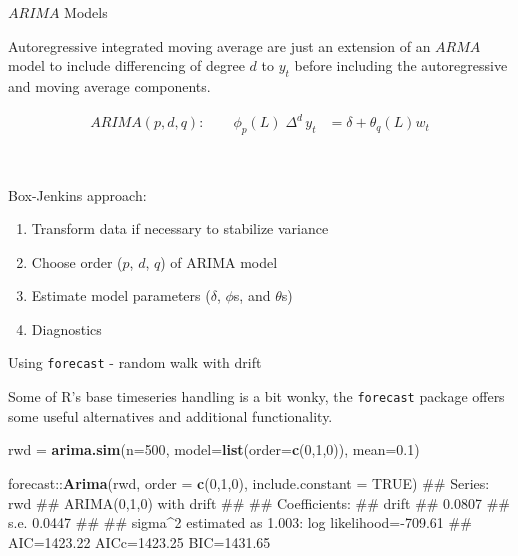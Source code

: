 \documentclass[11pt,ignorenonframetext,]{beamer}
\newenvironment{Shaded}{}{}
\newcommand{\DataTypeTok}[1]{\textcolor[rgb]{0.56,0.13,0.00}{#1}}
\newcommand{\DecValTok}[1]{\textcolor[rgb]{0.25,0.63,0.44}{#1}}
\newcommand{\FloatTok}[1]{\textcolor[rgb]{0.25,0.63,0.44}{#1}}
\newcommand{\KeywordTok}[1]{\textcolor[rgb]{0.00,0.44,0.13}{\textbf{#1}}}
\newcommand{\NormalTok}[1]{#1}
\newcommand{\OperatorTok}[1]{\textcolor[rgb]{0.40,0.40,0.40}{#1}}
\newcommand{\OtherTok}[1]{\textcolor[rgb]{0.00,0.44,0.13}{#1}}
\newcommand{\StringTok}[1]{\textcolor[rgb]{0.25,0.44,0.63}{#1}}
\let\oldShaded\Shaded
\let\endoldShaded\endShaded
\renewenvironment{Shaded}{\footnotesize\begin{spacing}{0.9}\oldShaded}{\endoldShaded\end{spacing}}
\begin{document}
\begin{frame}{%
\protect\hypertarget{arima-models}{%
\(ARIMA\) Models}}

Autoregressive integrated moving average are just an extension of an
\(ARMA\) model to include differencing of degree \(d\) to \(y_t\) before
including the autoregressive and moving average components.

\[
\begin{aligned}
ARIMA(p,d,q): \qquad \phi_p(L) \; \Delta^d \, y_t &= \delta + \theta_q(L) w_t  
\end{aligned}
\]

\pause

\(~\)

Box-Jenkins approach:

\begin{enumerate}
[1.]
\item
  Transform data if necessary to stabilize variance
\item
  Choose order (\(p\), \(d\), \(q\)) of ARIMA model
\item
  Estimate model parameters (\(\delta\), \(\phi\)s, and \(\theta\)s)
\item
  Diagnostics
\end{enumerate}

\end{frame}

\begin{frame}[fragile,t]{%
\protect\hypertarget{using-forecast---random-walk-with-drift}{%
Using \texttt{forecast} - random walk with drift}}

Some of R’s base timeseries handling is a bit wonky, the
\texttt{forecast} package offers some useful alternatives and additional
functionality.

\begin{Shaded}
\begin{Highlighting}[]
\NormalTok{rwd =}\StringTok{ }\KeywordTok{arima.sim}\NormalTok{(}\DataTypeTok{n=}\DecValTok{500}\NormalTok{, }\DataTypeTok{model=}\KeywordTok{list}\NormalTok{(}\DataTypeTok{order=}\KeywordTok{c}\NormalTok{(}\DecValTok{0}\NormalTok{,}\DecValTok{1}\NormalTok{,}\DecValTok{0}\NormalTok{)), }\DataTypeTok{mean=}\FloatTok{0.1}\NormalTok{) }

\NormalTok{forecast}\OperatorTok{::}\KeywordTok{Arima}\NormalTok{(rwd, }\DataTypeTok{order =} \KeywordTok{c}\NormalTok{(}\DecValTok{0}\NormalTok{,}\DecValTok{1}\NormalTok{,}\DecValTok{0}\NormalTok{), }\DataTypeTok{include.constant =} \OtherTok{TRUE}\NormalTok{)}
\NormalTok{## Series: rwd }
\NormalTok{## ARIMA(0,1,0) with drift }
\NormalTok{## }
\NormalTok{## Coefficients:}
\NormalTok{##        drift}
\NormalTok{##       0.0807}
\NormalTok{## s.e.  0.0447}
\NormalTok{## }
\NormalTok{## sigma^2 estimated as 1.003:  log likelihood=-709.61}
\NormalTok{## AIC=1423.22   AICc=1423.25   BIC=1431.65}
\end{Highlighting}
\end{Shaded}

\end{frame}
\end{document}
